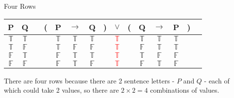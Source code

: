 \documentclass[
  ignorenonframetext,
]{beamer}
\renewcommand{\,}{\text{, }}
\def\True{\mathbb{T}}
\def\False{\mathbb{F}}
\begin{document}
\begin{frame}{Four Rows}
\protect\hypertarget{four-rows-1}{}

\begin{center}
\begin{tabular}{@{ }c@{ }@{ }c | c@{ }@{}c@{}@{ }c@{ }@{ }c@{ }@{ }c@{ }@{}c@{}@{ }c@{ }@{}c@{}@{ }c@{ }@{ }c@{ }@{ }c@{ }@{}c@{}@{ }c}
P & Q &  & ( & P & $\rightarrow$ & Q & ) & $\lor$ & ( & Q & $\rightarrow$ & P & ) & \\
\hline 
$\True$ & $\True$ &  &  & $\True$ & $\True$ & $\True$ &  & \textcolor{red}{$\True$} &  & $\True$ & $\True$ & $\True$ &  & \\
$\True$ & $\False$ &  &  & $\True$ & $\False$ & $\False$ &  & \textcolor{red}{$\True$} &  & $\False$ & $\True$ & $\True$ &  & \\
$\False$ & $\True$ &  &  & $\False$ & $\True$ & $\True$ &  & \textcolor{red}{$\True$} &  & $\True$ & $\False$ & $\False$ &  & \\
$\False$ & $\False$ &  &  & $\False$ & $\True$ & $\False$ &  & \textcolor{red}{$\True$} &  & $\False$ & $\True$ & $\False$ &  & \\
\end{tabular}
\bigskip
\end{center}

There are four rows because there are 2 sentence letters - \(P\) and
\(Q\) - each of which could take 2 values, so there are
\(2 \times 2 = 4\) combinations of values.

\end{frame}
\end{document}

